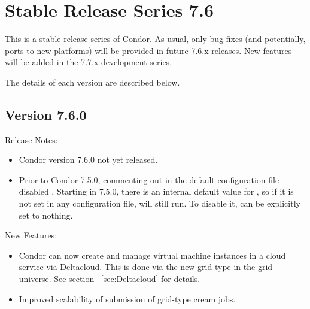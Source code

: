 
\section{\label{sec:History-7-6}Stable Release Series 7.6}

This is a stable release series of Condor.
As usual, only bug fixes (and potentially, ports to new platforms)
will be provided in future 7.6.x releases.
New features will be added in the 7.7.x development series.

The details of each version are described below.

\subsection*{\label{sec:New-7-6-0}Version 7.6.0}

\noindent Release Notes:

\begin{itemize}

\item Condor version 7.6.0 not yet released.

\item Prior to Condor 7.5.0, commenting out  in the
  default configuration file disabled .  Starting in
  7.5.0, there is an internal default value for , so if
  it is not set in any configuration file,  will still
  run.  To disable it,  can be explicitly set to
  nothing.

\end{itemize}


\noindent New Features:

\begin{itemize}

\item Condor can now create and manage virtual machine instances in a
cloud service via Deltacloud. This is done via the new
 grid-type in the grid universe.
See section ~\ref{sec:Deltacloud} for details.

\item Improved scalability of submission of grid-type cream jobs.

\end{itemize}

